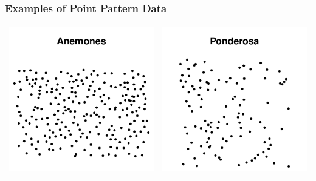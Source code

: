 \documentclass[mathserif,compress]{beamer}\usepackage{graphicx, color}
\makeatletter
\def\maxwidth{ %
  \ifdim\Gin@nat@width>\linewidth
    \linewidth
  \else
    \Gin@nat@width
  \fi
}
\makeatother
\begin{document}
\begin{frame}[fragile]
\frametitle{Examples of Point Pattern Data}











	\begin{tabular} {p{4.5cm} p{4.5cm}}
	{\centering \includegraphics[width=\maxwidth]{figure/anemones-plot} } &
	{\centering \includegraphics[width=\maxwidth]{figure/ponderosa-plot} }


\end{tabular}
\end{frame}
\end{document}
